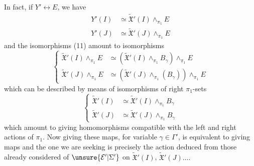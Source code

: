 In fact, if $Y'\longleftrightarrow E$, we have
\[
\begin{aligned}
Y'(I)&\simeq\widetilde{\mathfrak X}'(I)\mathbin{\wedge}_{\pi_1}E\\
Y'(J)&\simeq\widetilde{\mathfrak X}'(J)\mathbin{\wedge}_{\pi_1}E
\end{aligned}
\]
and the  isomorphisms (11) amount to isomorphisms
\[
\left\{\begin{aligned}
\widetilde{\mathfrak X}'(I)\mathbin{\wedge}_{\pi_1}E&\simeq(\widetilde{\mathfrak X}'(I)\mathbin{\wedge}_{\pi_1}B_\gamma)\mathbin{\wedge}_{\pi_1}E\\
\widetilde{\mathfrak X}'(J)\mathbin{\wedge}_{\pi_1}E&\simeq(\widetilde{\mathfrak X}'(J)\mathbin{\wedge}_{\pi_1}(B_\gamma))\mathbin{\wedge}_{\pi_1}E
\end{aligned}\right.
\]
which can be described by means of isomorphisms of right $\pi_1$-sets
\[
\left\{\begin{aligned}
\widetilde{\mathfrak X}'(I)&\simeq\widetilde{\mathfrak X}'(I)\mathbin{\wedge}_{\pi_1}B_\gamma\\
\widetilde{\mathfrak X}'(J)&\simeq\widetilde{\mathfrak X}'(J)\mathbin{\wedge}_{\pi_1}B_\gamma
\end{aligned}\right.
\]
which amount to giving homomorphisms
compatible with the left and right actions of $\pi_1$.
Now giving these maps, for variable $\gamma\in\Gamma'$, is equivalent  to giving maps
and the one we are seeking is precisely the action deduced from those already considered of $\unsure{\mathcal E'|\Sigma'}$ on $\widetilde{\mathfrak X}'(I)$, $\widetilde{\mathfrak X}'(J)\ldots.$
